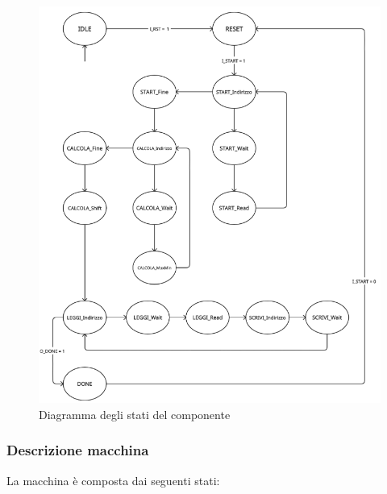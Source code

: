 \begin{figure}
    \includegraphics[width = 15 cm]{Immagini/Diagramma degli stati.png}
    \caption{Diagramma degli stati del componente}
    \label{fig:macchina_stati}
\end{figure}

\subsubsection{Descrizione macchina}
La macchina è composta dai seguenti stati:\\

